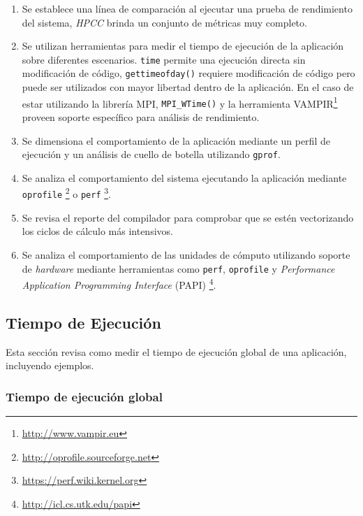\documentclass[a4paper]{report}
\begin{document}
\begin{enumerate}

\item Se establece una línea de comparación al ejecutar una prueba de rendimiento del sistema, {\it HPCC} brinda un conjunto de métricas muy completo. 

\item Se utilizan herramientas para medir el tiempo de ejecución de la aplicación sobre diferentes escenarios. {\tt time} permite una ejecución directa sin modificación de código,
{\tt gettimeofday()} requiere modificación de código pero puede ser utilizados con mayor libertad dentro de la aplicación.  
En el caso de estar utilizando la librería MPI, {\tt MPI\_WTime()} y la herramienta VAMPIR\footnote{\href{http://www.vampir.eu}{http://www.vampir.eu}} proveen soporte específico para análisis
de rendimiento.

\item Se dimensiona el comportamiento de la aplicación mediante un perfil de ejecución y un análisis de cuello de botella utilizando {\tt gprof}. 

\item Se analiza el comportamiento del sistema ejecutando la aplicación mediante {\tt oprofile} \footnote{\href{http://oprofile.sourceforge.net}{http://oprofile.sourceforge.net}} o
{\tt perf} \footnote{\href{https://perf.wiki.kernel.org}{https://perf.wiki.kernel.org}}. 

\item Se revisa el reporte del compilador para comprobar que se estén vectorizando los ciclos de cálculo más intensivos.

\item Se analiza el comportamiento de las unidades de cómputo utilizando soporte de {\it hardware} mediante herramientas como {\tt perf}, {\tt oprofile} y {\it Performance Application Programming Interface} (PAPI) \footnote{\href{http://icl.cs.utk.edu/papi}{http://icl.cs.utk.edu/papi}}.

\end{enumerate}

\subsection{Tiempo de Ejecución}

Esta sección revisa como medir el tiempo de ejecución global de una aplicación, incluyendo ejemplos.

\subsubsection{Tiempo de ejecución global}
\end{document}
